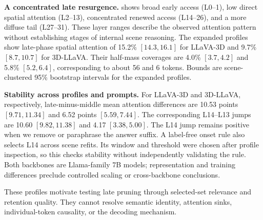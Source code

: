 \textbf{A concentrated late resurgence.}  shows broad early access (L0--1), low direct spatial attention (L2--13), concentrated renewed access (L14--26), and a more diffuse tail (L27--31). These layer ranges describe the observed attention pattern without establishing stages of internal scene reasoning. The expanded profiles show late-phase spatial attention of 15.2\% $[14.3,16.1]$ for LLaVA-3D and 9.7\% $[8.7,10.7]$ for 3D-LLaVA. Their half-mass coverages are 4.0\% $[3.7,4.2]$ and 5.8\% $[5.2,6.4]$, corresponding to about 56 and 6 tokens. Bounds are scene-clustered 95\% bootstrap intervals for the expanded profiles.

\textbf{Stability across profiles and prompts.} For LLaVA-3D and 3D-LLaVA, respectively, late-minus-middle mean attention differences are 10.53 points $[9.71,11.34]$ and 6.52 points $[5.59,7.44]$. The corresponding L14--L13 jumps are 10.60 $[9.82,11.38]$ and 4.17 $[3.38,5.00]$. The L14 jump remains positive when we remove or paraphrase the answer suffix. A label-free onset rule also selects L14 across scene refits. Its window and threshold were chosen after profile inspection, so this checks stability without independently validating the rule. Both backbones are Llama-family 7B models; representation and training differences preclude controlled scaling or cross-backbone conclusions.

These profiles motivate testing late pruning through selected-set relevance and retention quality. They cannot resolve semantic identity, attention sinks, individual-token causality, or the decoding mechanism.
